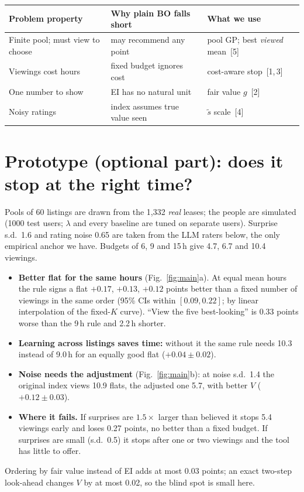 \documentclass[10pt,a4paper,twocolumn]{article}
\newcommand{\lead}[1]{\textbf{#1}}
\begin{document}
\begin{center}\footnotesize
\begin{tabular}{@{}>{\raggedright\arraybackslash}p{}>{\raggedright\arraybackslash}p{}>{\raggedright\arraybackslash}p{}@{}}\toprule
Problem property & Why plain BO falls short & What we use\\\midrule
Finite pool; must view to choose & may recommend any point & pool GP; best \emph{viewed} mean~[5]\\
Viewings cost hours & fixed budget ignores cost & cost-aware stop~[1,\,3]\\
One number to show & EI has no natural unit & fair value $g$~[2]\\
Noisy ratings & index assumes true value seen & $\tilde s$ scale~[4]\\\bottomrule
\end{tabular}
\end{center}

\section{Prototype (optional part): does it stop at the right time?}

Pools of 60 listings are drawn from the 1,332 \emph{real} leases; the people are simulated (1000 test users;
$\lambda$ and every baseline are tuned on separate users). Surprise s.d.\ 1.6 and rating noise 0.65 are taken
from the LLM raters below, the only empirical anchor we have. Budgets of 6, 9 and 15\,h give 4.7, 6.7 and 10.4
viewings.

\begin{itemize}
\item \lead{Better flat for the same hours} (Fig.~\ref{fig:main}a). At equal mean hours the rule signs a flat
$+0.17$, $+0.13$, $+0.12$ points better than a fixed number of viewings in the same order (95\% CIs within
$[0.09,0.22]$; by linear interpolation of the fixed-$K$ curve). ``View the five best-looking'' is 0.33 points
worse than the 9\,h rule and 2.2\,h shorter.
\item \lead{Learning across listings saves time:} without it the same rule needs 10.3 instead of 9.0\,h for an
equally good flat ($+0.04\pm0.02$).
\item \lead{Noise needs the adjustment} (Fig.~\ref{fig:main}b): at noise s.d.\ 1.4 the original index views
10.9 flats, the adjusted one 5.7, with better $V$ ($+0.12\pm0.03$).
\item \lead{Where it fails.} If surprises are $1.5\times$ larger than believed it stops 5.4 viewings early and
loses 0.27 points, no better than a fixed budget. If surprises are small (s.d.\ 0.5) it stops after one or
two viewings and the tool has little to offer.
\end{itemize}
Ordering by fair value instead of EI adds at most 0.03 points; an exact two-step look-ahead changes $V$ by
at most 0.02, so the blind spot is small here.
\end{document}

